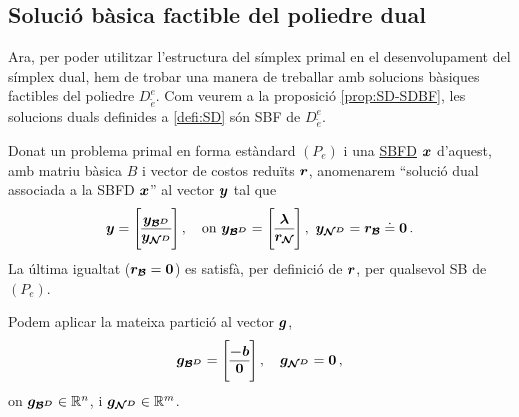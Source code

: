 \subsection{Solució bàsica factible del poliedre dual}
Ara, per poder utilitzar l'estructura del símplex primal en el desenvolupament
del símplex dual, hem de trobar una manera de treballar amb solucions bàsiques
factibles del poliedre $D^e_{\tilde{e}}$. Com veurem a la proposició
\ref{prop:SD-SDBF}, les solucions duals definides a \ref{defi:SD} són SBF de
$D^e_{\tilde{e}}$. 

\begin{defi}\label{defi:SD}
	Donat un problema primal en forma estàndard $(P_e)$ i una
	\hyperref[defi:SBFD]{SBFD} $\boldsymbol{x}$ d'aquest, amb matriu bàsica $B$ i 
	vector de
	costos reduïts $\boldsymbol{r}$, anomenarem ``solució dual associada a la SBFD
	$\boldsymbol{x}$'' al vector $\boldsymbol{y}$ tal que
	\[
	\vb{y} = 
	\left[\begin{array}{@{}c@{}}
	\vb{y_{\B^D}}\\
	\hline
	\vb{y_{\N^D}}
	\end{array}\right],\quad\text{on }
	\vb{y_{\B^D}}=
	\left[\begin{array}{@{}c@{}}
	\vb{\lambda}\\
	\hline
	\vb{r_\N}
	\end{array}\right],\ 
	\vb{y_{\N^D}} = \vb{r_\B} \doteq \vb{0}\,.	
	\]
	La última igualtat ($\boldsymbol{r_{\mathcal{B}}}=\boldsymbol{0}$) es satisfà, per definició de 
	$\boldsymbol{r}$,
	per qualsevol SB de $(P_e)$.
\end{defi}


Podem aplicar la mateixa partició al vector $\boldsymbol{g}$,
\[
\vb{g_{\B^D}} = 
\left[\begin{array}{@{}c@{}}
\vb{-b}\\
\hline
\vb{0}\\
\end{array}\right], \quad
%
\vb{g_{\N^D}} = \vb{0}\,,
\]
on $\boldsymbol{g_{\mathcal{B}^D}}\in \mathbb{R}^{n}$, i $\boldsymbol{g_{\mathcal{N}^D}}\in \mathbb{R}^m$.

